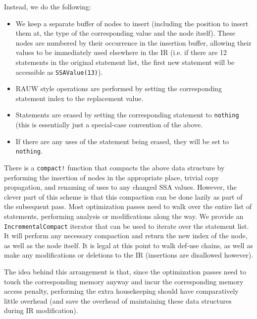 Instead, we do the following:



\begin{itemize}
\item We keep a separate buffer of nodes to insert (including the position to insert them at, the type of the corresponding value and the node itself). These nodes are numbered by their occurrence in the insertion buffer, allowing their values to be immediately used elsewhere in the IR (i.e. if there are 12 statements in the original statement list, the first new statement will be accessible as \texttt{SSAValue(13)}).


\item RAUW style operations are performed by setting the corresponding statement index to the replacement value.


\item Statements are erased by setting the corresponding statement to \texttt{nothing} (this is essentially just a special-case convention of the above.


\item If there are any uses of the statement being erased, they will be set to \texttt{nothing}.

\end{itemize}


There is a \texttt{compact!} function that compacts the above data structure by performing the insertion of nodes in the appropriate place, trivial copy propagation, and renaming of uses to any changed SSA values. However, the clever part of this scheme is that this compaction can be done lazily as part of the subsequent pass. Most optimization passes need to walk over the entire list of statements, performing analysis or modifications along the way. We provide an \texttt{IncrementalCompact} iterator that can be used to iterate over the statement list. It will perform any necessary compaction and return the new index of the node, as well as the node itself. It is legal at this point to walk def-use chains, as well as make any modifications or deletions to the IR (insertions are disallowed however).



The idea behind this arrangement is that, since the optimization passes need to touch the corresponding memory anyway and incur the corresponding memory access penalty, performing the extra housekeeping should have comparatively little overhead (and save the overhead of maintaining these data structures during IR modification).




